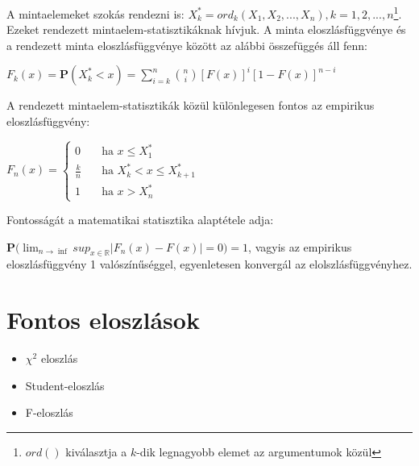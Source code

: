 A mintaelemeket szokás rendezni is: $X_k^* = ord_k(X_1,X_2,...,X_n), k=1,2,...,n$\footnote{$ord()$ kiválasztja a $k$-dik legnagyobb elemet az argumentumok közül}. Ezeket rendezett mintaelem-statisztikáknak hívjuk. A minta eloszlásfüggvénye és a rendezett minta eloszlásfüggvénye között az alábbi összefüggés áll fenn:

$F_k(x) = \mathbf{P}(X_k^* < x) = \sum_{i=k}^n \binom{n}{i} [F(x)]^i [1-F(x)]^{n-i}$

A rendezett mintaelem-statisztikák közül különlegesen fontos az empirikus eloszlásfüggvény:

$F_n(x) = 
  \begin{cases}
    0       & \quad \text{ha } x \leq X_1^* \\
    \frac{k}{n}  & \quad \text{ha } X_k^* < x \leq X_{k+1}^*\\
    1		& \quad \text{ha } x>X_n^* \end{cases}
  $
  
Fontosságát a matematikai statisztika alaptétele adja:

$\mathbf{P}\Big( \displaystyle\lim_{n \to \inf
} sup_{x\in\mathbb{R}} |F_n(x)-F(x)| = 0 \Big) = 1$, vagyis az empirikus eloszlásfüggvény 1 valószínűséggel, egyenletesen konvergál az elolszlásfüggvényhez.

\section{Fontos eloszlások}

\begin{itemize}
\item $\chi^2$ eloszlás
\item Student-eloszlás
\item F-eloszlás
\end{itemize}